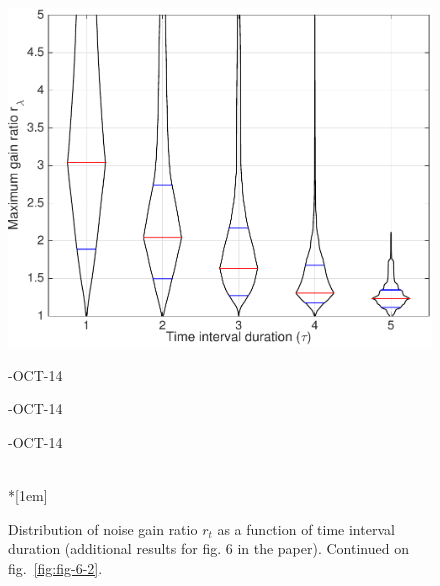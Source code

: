 \begin{figure}
\includegraphics[width=\mylength]{dist/20141020-maxGain-local-relativePerf} \\
\parbox{\mylength}{-OCT-14}
\parbox{\mylength}{-OCT-14}
\parbox{\mylength}{-OCT-14} \\*[1em]
\caption{Distribution of noise gain ratio $r_t$ as a function of time interval duration (additional results for fig. 6 in the paper). Continued on fig.~\ref{fig:fig-6-2}.}
\label{fig:fig-6-1}
\end{figure}

